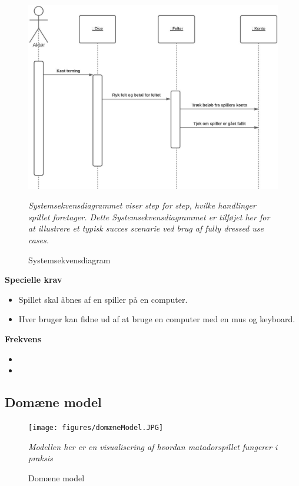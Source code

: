         \begin{figure}[H]
            \centering
            \includegraphics[width=14cm]{figures/systemSekvensDiagram.JPG}
            \caption{Systemsekvensdiagram}
            \emph{Systemsekvensdiagrammet viser step for step, hvilke handlinger spillet foretager. Dette Systemsekvensdiagrammet er tilføjet her for at illustrere et typisk succes scenarie ved brug af fully dressed use cases.}
        \end{figure}
        
        \textbf{Specielle krav} 
        \begin{itemize}
            \item Spillet skal åbnes af en spiller på en computer.
            \item Hver bruger kan fidne ud af at bruge en computer med en mus og keyboard.
        \end{itemize}
        
        \textbf{Frekvens}
        \begin{itemize}
            \item 
            \item
            
        \end{itemize}
        
        
    \subsection{Domæne model}
        \begin{figure}[H]
            \centering
            \texttt{[image: figures/domæneModel.JPG]}
            \caption{Domæne model}
            \emph{Modellen her er en visualisering af hvordan matadorspillet fungerer i praksis}
        \end{figure}

